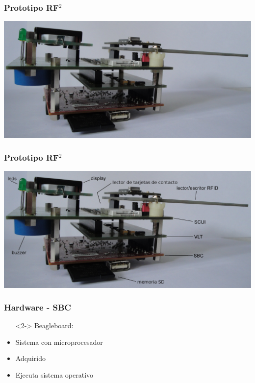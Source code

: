 \documentclass{beamer}
\begin{document}
\begin{frame}
	\frametitle{Prototipo RF$ ^{2} $}
	\begin{center}
		\includegraphics[scale=.12]{Imagenes/prototipo_s.jpg}
	\end{center}
\end{frame}


\begin{frame}
	\frametitle{Prototipo RF$ ^{2} $}
	\begin{center}
		\includegraphics[scale=.12]{Imagenes/prototipo_s_nombres.jpg}
	\end{center}
\end{frame}

\begin{frame}
	\frametitle{Hardware - SBC}
	\begin{itemize}
		\item[] <2-> Beagleboard:
	\end{itemize}
	\begin{figure}
		\centering		
	\end{figure}

	\begin{itemize}
		\item <3-> Sistema con microprocesador

		\bigskip
		\item <4-> Adquirido

		\bigskip
		\item <5-> Ejecuta sistema operativo
	\end{itemize}
\end{frame}
\end{document}
